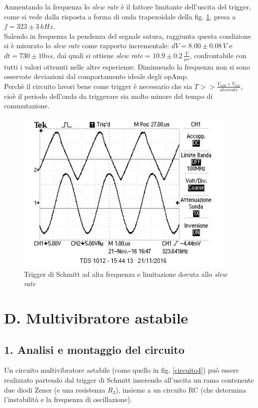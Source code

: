 \documentclass[10pt,a4paper]{article}
\begin{document}
Aumentando la frequenza  lo \emph{slew rate} è il fattore limitante dell'uscita del trigger, come si vede dalla risposta a forma di onda trapezoidale della fig. \ref{slew}, presa a $f = 323 \pm 3 \, kHz$. \\
Salendo in frequenza la pendenza del segnale satura, raggiunta questa condizione si è misurato lo \emph{slew rate} come rapporto incrementale: $dV = 8.00 \pm 0.08 \, V$ e $dt = 730 \pm 10 ns$, dai quali si ottiene \emph{slew rate} = $10.9 \pm 0.2 \, \frac{V}{\mu s}$, confrontabile con tutti i valori ottenuti nelle altre esperienze. Diminuendo la frequenza non si sono osservate deviazioni dal comportamento ideale degli opAmp. \\
Perchè il circuito lavori bene come trigger è necessario che sia $T >> \frac{V_{OH}+V_{OL}}{slew rate}$, cioè il periodo dell'onda da triggerare sia molto minore del tempo di commutazione.


\begin{figure}[htb!]
\centering
\includegraphics[scale=1.0]{immagini/slewRate.png}
\caption{Trigger di Schmitt ad alta frequenza e limitazione dovuta allo \emph{slew rate}}
\label{slew}
\end{figure}

\section*{D. Multivibratore astabile}
\subsection*{1. Analisi e montaggio del circuito}

Un circuito multivibratore astabile (come quello in fig. \ref{circuito4}) può essere realizzato partendo dal trigger di Schmitt inserendo all'uscita un ramo contenente due diodi Zener (e una resistenza $R_3$), insieme a un circuito RC (che determina l'instabilità e la frequenza di oscillazione).\\
\end{document}

